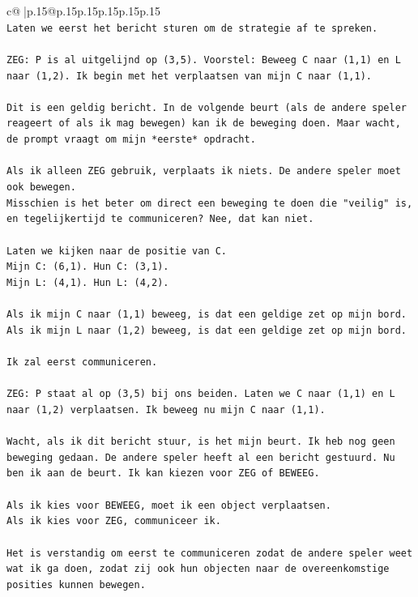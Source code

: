 \documentclass{article}
\begin{document}
{\begin{supertabular}{c@{$\;$}|p{.15\linewidth}@{}p{.15\linewidth}p{.15\linewidth}p{.15\linewidth}p{.15\linewidth}p{.15\linewidth}}
{{{\\ 
\texttt{Laten we eerst het bericht sturen om de strategie af te spreken.} \\
\\ 
\texttt{ZEG: P is al uitgelijnd op (3,5). Voorstel: Beweeg C naar (1,1) en L naar (1,2). Ik begin met het verplaatsen van mijn C naar (1,1).} \\
\\ 
\texttt{Dit is een geldig bericht. In de volgende beurt (als de andere speler reageert of als ik mag bewegen) kan ik de beweging doen. Maar wacht, de prompt vraagt om mijn *eerste* opdracht.} \\
\\ 
\texttt{Als ik alleen ZEG gebruik, verplaats ik niets. De andere speler moet ook bewegen.} \\
\texttt{Misschien is het beter om direct een beweging te doen die "veilig" is, en tegelijkertijd te communiceren? Nee, dat kan niet.} \\
\\ 
\texttt{Laten we kijken naar de positie van C.} \\
\texttt{Mijn C: (6,1). Hun C: (3,1).} \\
\texttt{Mijn L: (4,1). Hun L: (4,2).} \\
\\ 
\texttt{Als ik mijn C naar (1,1) beweeg, is dat een geldige zet op mijn bord.} \\
\texttt{Als ik mijn L naar (1,2) beweeg, is dat een geldige zet op mijn bord.} \\
\\ 
\texttt{Ik zal eerst communiceren.} \\
\\ 
\texttt{ZEG: P staat al op (3,5) bij ons beiden. Laten we C naar (1,1) en L naar (1,2) verplaatsen. Ik beweeg nu mijn C naar (1,1).} \\
\\ 
\texttt{Wacht, als ik dit bericht stuur, is het mijn beurt. Ik heb nog geen beweging gedaan. De andere speler heeft al een bericht gestuurd. Nu ben ik aan de beurt. Ik kan kiezen voor ZEG of BEWEEG.} \\
\\ 
\texttt{Als ik kies voor BEWEEG, moet ik een object verplaatsen.} \\
\texttt{Als ik kies voor ZEG, communiceer ik.} \\
\\ 
\texttt{Het is verstandig om eerst te communiceren zodat de andere speler weet wat ik ga doen, zodat zij ook hun objecten naar de overeenkomstige posities kunnen bewegen.} \\
}}}
\end{supertabular}}
\end{document}
